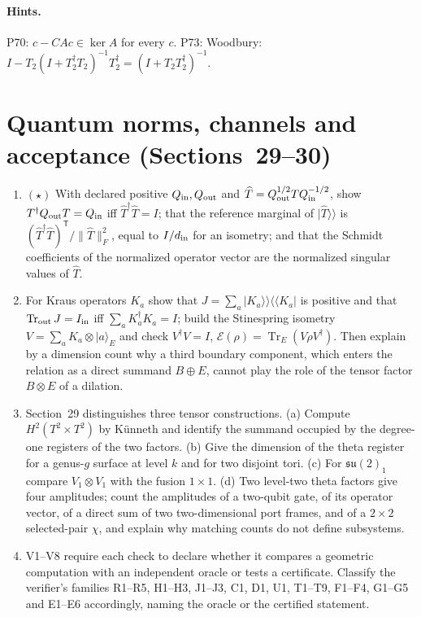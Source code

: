 \documentclass[11pt]{article}
\newcommand{\Tr}{\operatorname{Tr}}
\begin{document}
\paragraph{Hints.} P70: $c-CAc\in\ker A$ for every $c$. P73: Woodbury: $I-T_2(I+T_2^\dagger T_2)^{-1}T_2^\dagger = (I+T_2T_2^\dagger)^{-1}$.

\section{Quantum norms, channels and acceptance (Sections~29--30)}

\begin{enumerate}[label=\textbf{P\arabic*.},leftmargin=*,start=74]
\item $(\star)$ With declared positive $Q_{\rm in},Q_{\rm out}$ and
  $\widehat T = Q_{\rm out}^{1/2}TQ_{\rm in}^{-1/2}$, show
  $T^\dagger Q_{\rm out}T = Q_{\rm in}$ iff $\widehat T^\dagger\widehat T = I$;
  that the reference marginal of $|\widehat T\rangle\!\rangle$ is
  $(\widehat T^\dagger\widehat T)^{\mathsf T}/\|\widehat T\|_F^2$, equal to
  $I/d_{\rm in}$ for an isometry; and that the Schmidt coefficients of the
  normalized operator vector are the normalized singular values of $\widehat T$.
\item For Kraus operators $K_a$ show that $J = \sum_a|K_a\rangle\!\rangle\langle\!\langle K_a|$
  is positive and that $\Tr_{\rm out}J = I_{\rm in}$ iff $\sum_aK_a^\dagger K_a = I$;
  build the Stinespring isometry $V = \sum_aK_a\otimes|a\rangle_E$ and check
  $V^\dagger V = I$, $\mathcal E(\rho) = \Tr_E(V\rho V^\dagger)$. Then explain by a
  dimension count why a third boundary component, which enters the relation
  as a direct summand $B\oplus E$, cannot play the role of the tensor factor
  $B\otimes E$ of a dilation.
\item Section~29 distinguishes three tensor constructions. (a) Compute
  $H^2(T^2\times T^2)$ by K\"unneth and identify the summand occupied by the
  degree-one registers of the two factors. (b) Give the dimension of the
  theta register for a genus-$g$ surface at level $k$ and for two disjoint
  tori. (c) For $\mathfrak{su}(2)_1$ compare $V_1\otimes V_1$ with the fusion
  $1\times1$. (d) Two level-two theta factors give four amplitudes; count the
  amplitudes of a two-qubit gate, of its operator vector, of a direct sum of
  two two-dimensional port frames, and of a $2\times2$ selected-pair $\chi$,
  and explain why matching counts do not define subsystems.
\item V1--V8 require each check to declare whether it compares a geometric
  computation with an independent oracle or tests a certificate. Classify
  the verifier's families R1--R5, H1--H3, J1--J3, C1, D1, U1, T1--T9, F1--F4,
  G1--G5 and E1--E6 accordingly, naming the oracle or the certified statement.
\end{enumerate}
\end{document}

